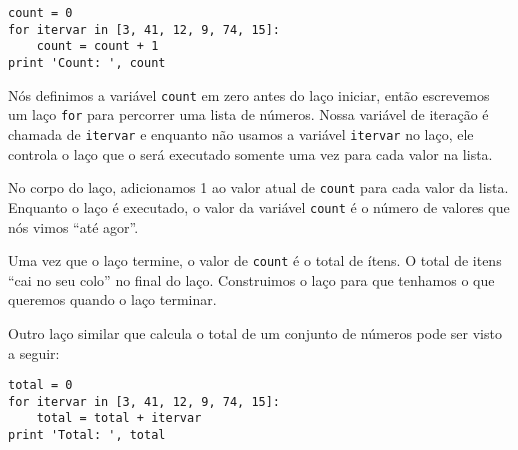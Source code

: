 \beforeverb
\begin{verbatim}
count = 0
for itervar in [3, 41, 12, 9, 74, 15]:
    count = count + 1
print 'Count: ', count
\end{verbatim}
\afterverb
%

%
Nós definimos a variável {\tt count} em zero antes do laço iniciar, então
escrevemos um laço {\tt for} para percorrer uma lista de números. Nossa
variável de iteração é chamada de {\tt itervar} e enquanto não usamos a
variável {\tt itervar} no laço, ele controla o laço que o será executado
somente uma vez para cada valor na lista.


No corpo do laço, adicionamos 1 ao valor atual de {\tt count} para cada valor
da lista. Enquanto o laço é executado, o valor da variável {\tt count} é o
número de valores que nós vimos ``até agor''.


Uma vez que o laço termine, o valor de {\tt count} é o total de ítens. O
total de itens ``cai no seu colo'' no final do laço. Construimos o laço para
que tenhamos o que queremos quando o laço terminar.


Outro laço similar que calcula o total de um conjunto de números pode ser
visto a seguir:

\beforeverb
\begin{verbatim}
total = 0
for itervar in [3, 41, 12, 9, 74, 15]:
    total = total + itervar
print 'Total: ', total
\end{verbatim}
\afterverb
%

